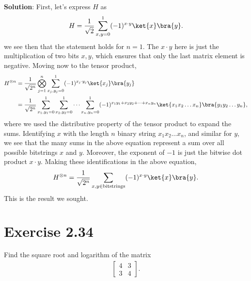 \documentclass{book}
\begin{document}
    \textbf{Solution}: First, let's express $H$ as
    \begin{align}
        H = \frac{1}{\sqrt{2}}\sum_{x,y = 0}^1 (-1)^{x\cdot y} \ket{x}\bra{y}.
    \end{align}
    we see then that the statement holds for $n = 1$. The $x\cdot y$ here is just the multiplication of two bits $x, y$, which ensures that only the last matrix element is negative. Moving now to the tensor product,
    \begin{align}
        H^{\otimes n} &= \frac{1}{\sqrt{2^n}} \bigotimes_{j = 1}^n \sum_{x_j, y_j = 0}^1 (-1)^{x_j\cdot y_j} \ket{x_j}\bra{y_j} \\
        &= \frac{1}{\sqrt{2^n}} \sum_{x_1, y_1 = 0}^1 \sum_{x_2, y_2 = 0}^1 \dots \sum_{x_n, y_n = 0}^1 (-1)^{x_1 y_1 + x_2 y_2 + \dots + x_n y_n} \ket{x_1 x_2 \dots x_n} \bra{y_1 y_2 \dots y_n},
    \end{align}
    where we used the distributive property of the tensor product to expand the sums. Identifying $x$ with the length $n$ binary string $x_1 x_2 \dots x_n$, and similar for $y$, we see that the many sums in the above equation represent a sum over all possible bitstrings $x$ and $y$. Moreover, the exponent of $-1$ is just the bitwise dot product $x\cdot y$. Making these identifications in the above equation,
    \begin{align}
        H^{\otimes n} = \frac{1}{\sqrt{2^n}} \sum_{x,y \in \text{bitstrings}} (-1)^{x\cdot y} \ket{x}\bra{y}.
    \end{align}
    This is the result we sought. 
    
\section*{Exercise 2.34}
    Find the square root and logarithm of the matrix
    \begin{align}
    \begin{bmatrix}
        4 & 3 \\
        3 & 4
    \end{bmatrix}.
    \end{align}
    
\end{document}
